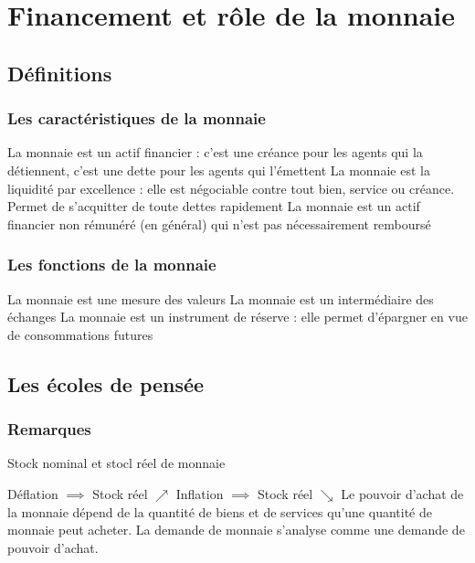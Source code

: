 \chapter{Financement et rôle de la monnaie}
\section{Définitions}
\subsection{Les caractéristiques de la monnaie}
\textcolor{BrickRed}{La monnaie est un actif financier} : c'est une créance pour les agents qui la détiennent, c'est une dette pour les agents qui l'émettent \newline
\textcolor{BrickRed}{La monnaie est la liquidité par excellence} : elle est négociable contre tout bien, service ou créance. Permet de s'acquitter de toute dettes rapidement \newline
\textcolor{BrickRed}{La monnaie est un actif financier non rémunéré (en général) qui n'est pas nécessairement remboursé} \newline

\subsection{Les fonctions de la monnaie}
\textcolor{BrickRed}{La monnaie est une mesure des valeurs} \newline
\textcolor{BrickRed}{La monnaie est un intermédiaire des échanges} \newline
\textcolor{BrickRed}{La monnaie est un instrument de réserve} : elle permet d'épargner en vue de consommations futures
\newpage
\section{Les écoles de pensée}
\subsection{Remarques}
\textcolor{BrickRed}{Stock nominal et stocl réel de monnaie}
\begin{center}
    \Large{}
\end{center}
\textcolor{BrickRed}{Déflation $\implies$ Stock réel $\nearrow$} \newline
\textcolor{BrickRed}{Inflation $\implies$ Stock réel $\searrow$} \newline
\textcolor{BrickRed}{Le pouvoir d'achat de la monnaie dépend de la quantité de biens et de services qu'une quantité de monnaie peut acheter.}
\textcolor{BrickRed}{La demande de monnaie s'analyse comme une demande de pouvoir d'achat.}
